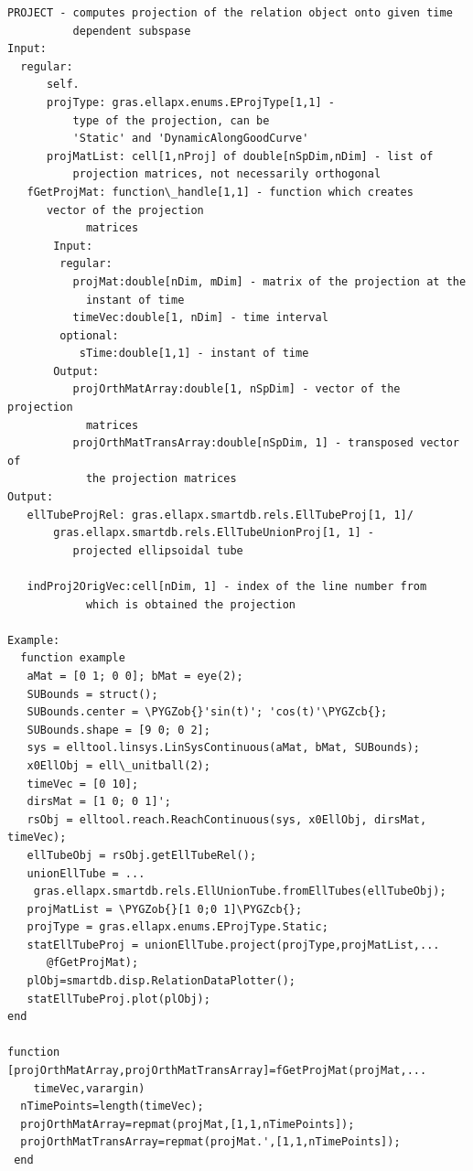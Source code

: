 \documentclass[letterpaper,10pt,english]{sphinxmanual}
\def\PYGZob{\char`\{}
\def\PYGZcb{\char`\}}
\begin{document}
\begin{Verbatim}[commandchars=\\\{\}]
PROJECT - computes projection of the relation object onto given time
          dependent subspase
Input:
  regular:
      self.
      projType: gras.ellapx.enums.EProjType[1,1] -
          type of the projection, can be
          'Static' and 'DynamicAlongGoodCurve'
      projMatList: cell[1,nProj] of double[nSpDim,nDim] - list of
          projection matrices, not necessarily orthogonal
   fGetProjMat: function\_handle[1,1] - function which creates
      vector of the projection
            matrices
       Input:
        regular:
          projMat:double[nDim, mDim] - matrix of the projection at the
            instant of time
          timeVec:double[1, nDim] - time interval
        optional:
           sTime:double[1,1] - instant of time
       Output:
          projOrthMatArray:double[1, nSpDim] - vector of the projection
            matrices
          projOrthMatTransArray:double[nSpDim, 1] - transposed vector of
            the projection matrices
Output:
   ellTubeProjRel: gras.ellapx.smartdb.rels.EllTubeProj[1, 1]/
       gras.ellapx.smartdb.rels.EllTubeUnionProj[1, 1] -
          projected ellipsoidal tube

   indProj2OrigVec:cell[nDim, 1] - index of the line number from
            which is obtained the projection

Example:
  function example
   aMat = [0 1; 0 0]; bMat = eye(2);
   SUBounds = struct();
   SUBounds.center = \PYGZob{}'sin(t)'; 'cos(t)'\PYGZcb{};
   SUBounds.shape = [9 0; 0 2];
   sys = elltool.linsys.LinSysContinuous(aMat, bMat, SUBounds);
   x0EllObj = ell\_unitball(2);
   timeVec = [0 10];
   dirsMat = [1 0; 0 1]';
   rsObj = elltool.reach.ReachContinuous(sys, x0EllObj, dirsMat, timeVec);
   ellTubeObj = rsObj.getEllTubeRel();
   unionEllTube = ...
    gras.ellapx.smartdb.rels.EllUnionTube.fromEllTubes(ellTubeObj);
   projMatList = \PYGZob{}[1 0;0 1]\PYGZcb{};
   projType = gras.ellapx.enums.EProjType.Static;
   statEllTubeProj = unionEllTube.project(projType,projMatList,...
      @fGetProjMat);
   plObj=smartdb.disp.RelationDataPlotter();
   statEllTubeProj.plot(plObj);
end

function [projOrthMatArray,projOrthMatTransArray]=fGetProjMat(projMat,...
    timeVec,varargin)
  nTimePoints=length(timeVec);
  projOrthMatArray=repmat(projMat,[1,1,nTimePoints]);
  projOrthMatTransArray=repmat(projMat.',[1,1,nTimePoints]);
 end
\end{Verbatim}
\end{document}

